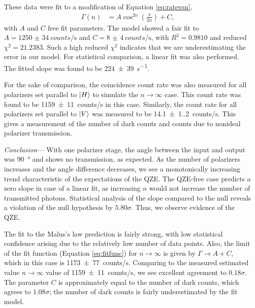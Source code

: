 \documentclass[%
reprint,
superscriptaddress,
nofootinbib,
nobibnotes,
nobalancelastpage,
amsmath,amssymb,
aps, 
prl,
floatfix,
]{revtex4-2}
\renewcommand{\section}[1]{\textit{#1}---\ignorespaces}
\begin{document}
These data were fit to a modification of Equation \ref{eq:ratevsn}, 
\begin{align}
    \Gamma(n) &= A \cos^{2n}\left(\frac{\pi}{2n}\right) + C\label{eq:fitfunc},
\end{align}
with $A$ and $C$ free fit parameters. The model showed a fair fit to $A=\qty{1250(34)}{counts/\second}$ and $C=\qty{8(4)}{counts/\second}$, with $R^2 = 0.9810$ and reduced $\chi^2 = 21.2383$. Such a high reduced $\chi^2$ indicates that we are underestimating the error in our model. For statistical comparison, a linear fit was also performed. The fitted slope was found to be \qty{224(39)}{\second^{-1}}.

For the sake of comparison, the coincidence count rate was also measured for all polarizers set parallel to $\ket{H}$ to simulate the $n\rightarrow\infty$ case. This count rate was found to be \qty{1159(11)}{counts/\second} in this case. Similarly, the count rate for all polarizers set parallel to $\ket{V}$ was measured to be \qty{14.1(1.2)}{counts/\second}. This gives a measurement of the number of dark counts and counts due to nonideal polarizer transmission.


\section{Conclusion}
With one polarizer stage, the angle between the input and output was \qty{90}{\degree} and shows no transmission, as expected. As the number of polarizers increases and the angle difference decreases, we see a monotonically increasing trend characteristic of the expectations of the QZE. The QZE-free case predicts a zero slope in case of a linear fit, as increasing $n$ would not increase the number of transmitted photons. Statistical analysis of the slope compared to the null reveals a violation of the null hypothesis by $\qty{5.80}\sigma$. Thus, we observe evidence of the QZE.

The fit to the Malus's law prediction is fairly strong, with low statistical confidence arising due to the relatively low number of data points. Also, the limit of the fit function (Equation \ref{eq:fitfunc}) for $n\rightarrow\infty$ is given by $\Gamma \rightarrow A + C$, which in this case is \qty{1173(77)}{counts/\second}. Comparing to the measured estimated value $n\rightarrow\infty$ value of \qty{1159(11)}{counts/\second}, we see excellent agreement to $\qty{0.18}\sigma$. The parameter $C$ is approximately equal to the number of dark counts, which agrees to $\qty{1.08}\sigma$; the number of dark counts is fairly underestimated by the fit model. 
\end{document}
